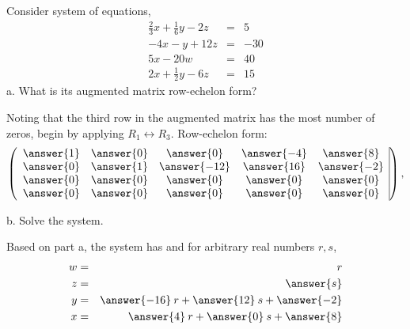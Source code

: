 \documentclass{ximera}
\begin{document}
\begin{exercise} Consider system of equations,
\begin{eqnarray*}
\frac{2}{3}x + \frac{1}{6}y -2z &=& 5\\
-4x -y+12z &=& -30\\
5x-20w &=& 40\\
2x+\frac{1}{2} y - 6z &=& 15
\end{eqnarray*}
a. What is its augmented matrix row-echelon form? \\
\begin{prompt}
Noting that the third row in the augmented matrix has the most number of zeros, begin by applying $R_{1}\leftrightarrow R_{3}$. Row-echelon form:
\[
\left(\begin{array}{ccccc|c}
  \answer{1} &  \answer{0} & \answer{0} & \answer{-4} &\answer{8} \\
  \answer{0} &  \answer{1} & \answer{-12} & \answer{16} &\answer{-2}\\
  \answer{0} &  \answer{0} & \answer{0} & \answer{0} &\answer{0}\\
  \answer{0} &  \answer{0} & \answer{0} & \answer{0} &\answer{0}
\end{array}\right),
\]
\end{prompt}

b. Solve the system. \\
\begin{prompt}
Based on part a, the system has  and for arbitrary real numbers $r,s$,
\begin{eqnarray*}
w&=& r\\
z &=& \answer{s}\\
y &=& \answer{-16}\hspace{.08cm}r + \answer{12}\hspace{.08cm}s + \answer{-2}\\
x&=& \answer{4}\hspace{.08cm} r + \answer{0}\hspace{.08cm}s + \answer{8}
\end{eqnarray*}
\end{prompt}
\end{exercise}
\end{document}

